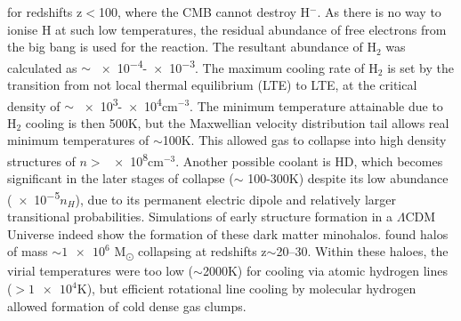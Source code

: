 \documentclass[11pt]{article}
\begin{document}
for redshifts z$<$100, where the CMB cannot destroy  H$^{-}$. As there is no way to ionise H at such low temperatures, the residual abundance of free electrons from the big bang is used for the reaction. The resultant abundance of H$_{2}$ was calculated as  $\sim$ \num{e-4}-\num{e-3}. The maximum cooling rate of H$_{2}$ is set by the transition from not local thermal equilibrium (LTE) to LTE, at the critical density of $\sim$ \num{e3}-\num{e4}cm$^{-3}$. The minimum temperature attainable due to H$_{2}$ cooling is then 500K, but the Maxwellian velocity distribution tail allows real minimum temperatures of $\sim$100K. This allowed gas to collapse into high density structures of $n >$ \num{e8}cm$^{-3}$. Another possible coolant is HD, which becomes significant in the later stages of collapse ($\sim$ 100-300K) despite its low abundance (\num{e-5}$n_{H}$), due to its permanent electric dipole and relatively larger transitional probabilities. 
Simulations of early structure formation in a $\Lambda$CDM Universe indeed show the formation of these dark matter minohalos. \cite{Yoshida2003} found halos of mass $\sim\num{1e6}$ M\textsubscript{\(\odot\)} collapsing at redshifts z$\sim$20–30. Within these haloes, the virial temperatures were too low ($\sim$2000K) for cooling via atomic hydrogen lines ($>\num{1e4}$K), but efficient rotational line cooling by molecular hydrogen allowed formation of cold dense gas clumps. 
\end{document}
